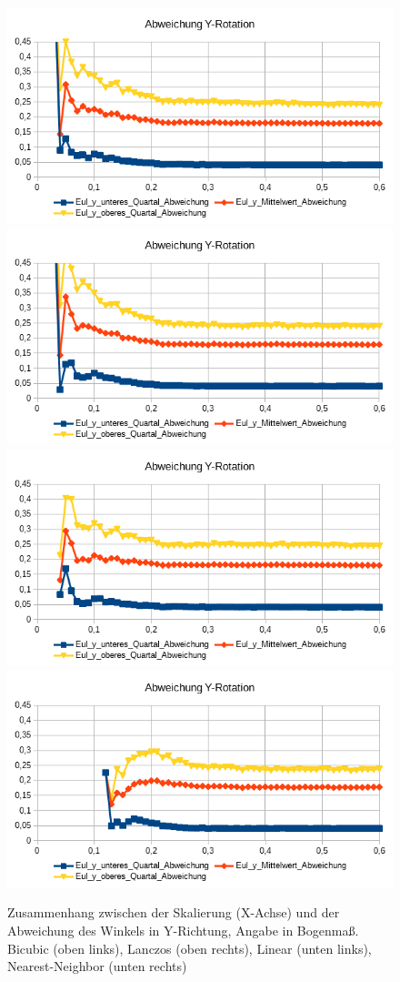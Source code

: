 \begin{figure}
	\centering
	\includegraphics[width=0.45\linewidth]{tabelle2/Y_Rot_Cubic}
	\includegraphics[width=0.45\linewidth]{tabelle2/Y_Rot_Lanc}
	\includegraphics[width=0.45\linewidth]{tabelle2/Y_Rot_Linear}
	\includegraphics[width=0.45\linewidth]{tabelle2/Y_Rot_NN}
	\caption{Zusammenhang zwischen der Skalierung (X-Achse) und der Abweichung des Winkels in Y-Richtung, Angabe in Bogenmaß.
		Bicubic (oben links), Lanczos (oben rechts), Linear (unten links), Nearest-Neighbor (unten rechts)}
	\label{img_Y_Rot_Skal}
\end{figure}
